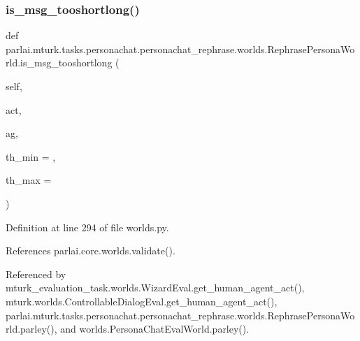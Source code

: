 \subsubsection{\texorpdfstring{is\+\_\+msg\+\_\+tooshortlong()}{is\_msg\_tooshortlong()}}
{\footnotesize\ttfamily def parlai.\+mturk.\+tasks.\+personachat.\+personachat\+\_\+rephrase.\+worlds.\+Rephrase\+Persona\+World.\+is\+\_\+msg\+\_\+tooshortlong (\begin{DoxyParamCaption}\item[{}]{self,  }\item[{}]{act,  }\item[{}]{ag,  }\item[{}]{th\+\_\+min = {},  }\item[{}]{th\+\_\+max = {} }\end{DoxyParamCaption})}



Definition at line 294 of file worlds.\+py.



References parlai.\+core.\+worlds.\+validate().



Referenced by mturk\+\_\+evaluation\+\_\+task.\+worlds.\+Wizard\+Eval.\+get\+\_\+human\+\_\+agent\+\_\+act(), mturk.\+worlds.\+Controllable\+Dialog\+Eval.\+get\+\_\+human\+\_\+agent\+\_\+act(), parlai.\+mturk.\+tasks.\+personachat.\+personachat\+\_\+rephrase.\+worlds.\+Rephrase\+Persona\+World.\+parley(), and worlds.\+Persona\+Chat\+Eval\+World.\+parley().

